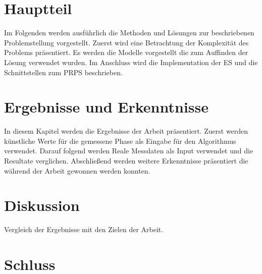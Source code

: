 \documentclass[a4paper,12pt, twoside, openright]{scrbook}
\begin{document}
\chapter{Hauptteil}
Im Folgenden werden ausführlich die Methoden und Lösungen zur beschriebenen Problemstellung vorgestellt. Zuerst wird eine Betrachtung der Komplexität des Problems präsentiert. Es werden die Modelle vorgestellt die zum Auffinden der Lösung verwendet wurden. Im Anschluss wird die Implementation der ES und die Schnittstellen zum PRPS beschrieben.
%

%
\chapter{Ergebnisse und Erkenntnisse}
In diesem Kapitel werden die Ergebnisse der Arbeit präsentiert. Zuerst werden künstliche Werte für die gemessene Phase als Eingabe für den Algorithmus verwendet. Darauf folgend werden Reale Messdaten als Input verwendet und die Resultate verglichen. Abschließend werden weitere Erkenntnisse präsentiert die während der Arbeit gewonnen werden konnten.\\
%

%
\chapter{Diskussion}
Vergleich der Ergebnisse mit den Zielen der Arbeit.\\
%
\lipsum[1-5]

%
\chapter{Schluss}
\lipsum[1-2]

%


\newpage

\nocite{*} %


\end{document}
